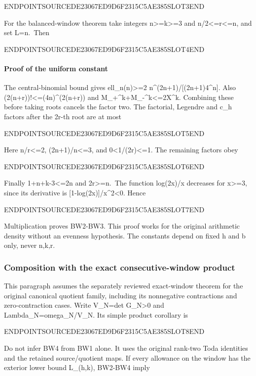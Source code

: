 ENDPOINTSOURCEDE23067ED9D6F2315C5AE385SLOT3END

For the balanced-window theorem take integers n\textgreater=k\textgreater=3 and n/2\textless=r\textless=n, and set L=n.~Then

ENDPOINTSOURCEDE23067ED9D6F2315C5AE385SLOT4END

\paragraph{Proof of the uniform constant}\label{endpoint-balanced_window--proof-of-the-uniform-constant}

The central-binomial bound gives ell\_n(n)\textgreater=2 n\^{}(2n+1)/{[}(2n+1)4\^{}n{]}. Also (2(n+r))!\textless=(4n)\^{}(2(n+r)) and M\_+\^{}k+M\_-\^{}k\textless=2X\^{}k. Combining these before taking roots cancels the factor two. The factorial, Legendre and c\_h factors after the 2r-th root are at most

ENDPOINTSOURCEDE23067ED9D6F2315C5AE385SLOT5END

Here n/r\textless=2, (2n+1)/n\textless=3, and 0\textless1/(2r)\textless=1. The remaining factors obey

ENDPOINTSOURCEDE23067ED9D6F2315C5AE385SLOT6END

Finally 1+n+k-3\textless=2n and 2r\textgreater=n.~The function log(2x)/x decreases for x\textgreater=3, since its derivative is {[}1-log(2x){]}/x\^{}2\textless0. Hence

ENDPOINTSOURCEDE23067ED9D6F2315C5AE385SLOT7END

Multiplication proves BW2-BW3. This proof works for the original arithmetic density without an evenness hypothesis. The constants depend on fixed h and b only, never n,k,r.

\subsubsection{Composition with the exact consecutive-window product}\label{endpoint-balanced_window--composition-with-the-exact-consecutive-window-product}

This paragraph assumes the separately reviewed exact-window theorem for the original canonical quotient family, including its nonnegative contractions and zero-contraction cases. Write V\_N=det G\_N\textgreater0 and Lambda\_N=omega\_N/V\_N. Its simple product corollary is

ENDPOINTSOURCEDE23067ED9D6F2315C5AE385SLOT8END

Do not infer BW4 from BW1 alone. It uses the original rank-two Toda identities and the retained source/quotient maps. If every allowance on the window has the exterior lower bound L\_(h,k), BW2-BW4 imply

